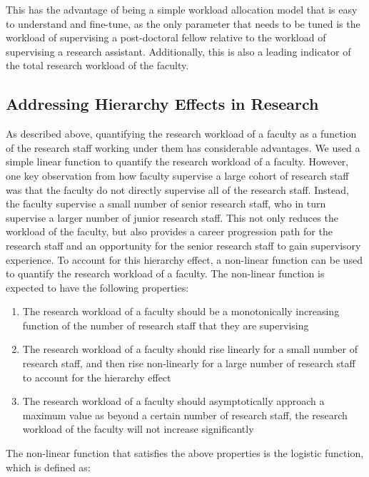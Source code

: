 This has the advantage of being a simple workload allocation model that is easy to understand and fine-tune, as the only parameter that needs to be tuned is the workload of supervising a post-doctoral fellow relative to the workload of supervising a research assistant. Additionally, this is also a leading indicator of the total research workload of the faculty.

\subsection{Addressing Hierarchy Effects in Research}

As described above, quantifying the research workload of a faculty as a function of the research staff working under them has considerable advantages. We used a simple linear function to quantify the research workload of a faculty. However, one key observation from how faculty supervise a large cohort of research staff was that the faculty do not directly supervise all of the research staff. Instead, the faculty supervise a small number of senior research staff, who in turn supervise a larger number of junior research staff. This not only reduces the workload of the faculty, but also provides a career progression path for the research staff and an opportunity for the senior research staff to gain supervisory experience. To account for this hierarchy effect, a non-linear function can be used to quantify the research workload of a faculty. The non-linear function is expected to have the following properties:

\begin{enumerate}

      \item The research workload of a faculty should be a monotonically increasing function of the number of research staff that they are supervising
      \item The research workload of a faculty should rise linearly for a small number of research staff, and then rise non-linearly for a large number of research staff to account for the hierarchy effect
      \item The research workload of a faculty should asymptotically approach a maximum value as beyond a certain number of research staff, the research workload of the faculty will not increase significantly

\end{enumerate}

The non-linear function that satisfies the above properties is the logistic function, which is defined as:


